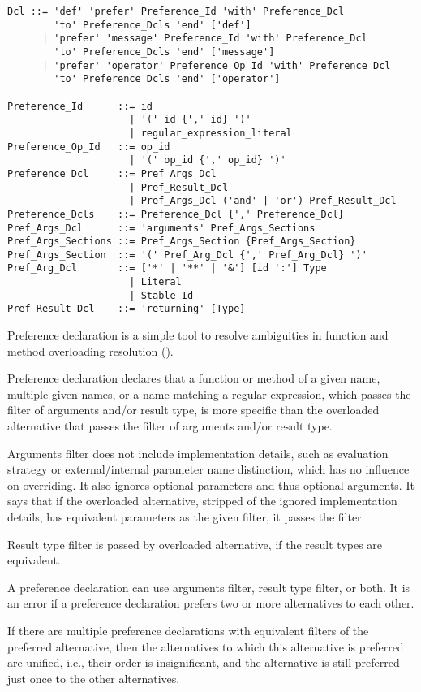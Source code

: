 \syntax\begin{lstlisting}
Dcl ::= 'def' 'prefer' Preference_Id 'with' Preference_Dcl 
        'to' Preference_Dcls 'end' ['def']
      | 'prefer' 'message' Preference_Id 'with' Preference_Dcl 
        'to' Preference_Dcls 'end' ['message']
      | 'prefer' 'operator' Preference_Op_Id 'with' Preference_Dcl 
        'to' Preference_Dcls 'end' ['operator']

Preference_Id      ::= id 
                     | '(' id {',' id} ')' 
                     | regular_expression_literal
Preference_Op_Id   ::= op_id 
                     | '(' op_id {',' op_id} ')'
Preference_Dcl     ::= Pref_Args_Dcl 
                     | Pref_Result_Dcl 
                     | Pref_Args_Dcl ('and' | 'or') Pref_Result_Dcl
Preference_Dcls    ::= Preference_Dcl {',' Preference_Dcl}
Pref_Args_Dcl      ::= 'arguments' Pref_Args_Sections
Pref_Args_Sections ::= Pref_Args_Section {Pref_Args_Section}
Pref_Args_Section  ::= '(' Pref_Arg_Dcl {',' Pref_Arg_Dcl} ')'
Pref_Arg_Dcl       ::= ['*' | '**' | '&'] [id ':'] Type
                     | Literal
                     | Stable_Id
Pref_Result_Dcl    ::= 'returning' [Type]
\end{lstlisting}

Preference declaration is a simple tool to resolve ambiguities in function and method overloading resolution (). 

Preference declaration declares that a function or method of a given name, multiple given names, or a name matching a regular expression, which passes the filter of arguments and/or result type, is more specific than the overloaded alternative that passes the filter of arguments and/or result type. 

Arguments filter does not include implementation details, such as evaluation strategy or external/internal parameter name distinction, which has no influence on overriding. It also ignores optional parameters and thus optional arguments. It says that if the overloaded alternative, stripped of the ignored implementation details, has equivalent parameters as the given filter, it passes the filter.

Result type filter is passed by overloaded alternative, if the result types are equivalent. 

A preference declaration can use arguments filter, result type filter, or both. It is an error if a preference declaration prefers two or more alternatives to each other. 

If there are multiple preference declarations with equivalent filters of the preferred alternative, then the alternatives to which this alternative is preferred are unified, i.e., their order is insignificant, and the alternative is still preferred just once to the other alternatives. 

